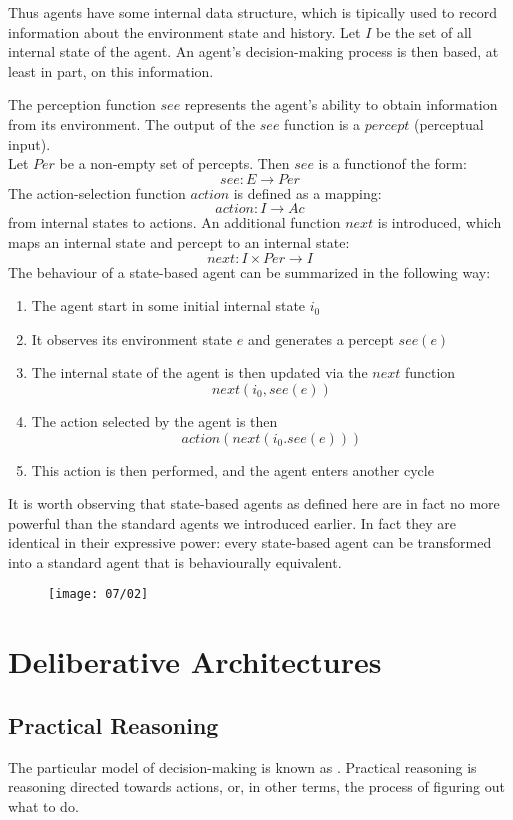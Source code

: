Thus agents have some internal data structure, which is tipically used to record information about the environment state and history. Let $I$ be the set of all internal state of the agent. An agent's decision-making process is then based, at least in part, on this information.

The perception function $see$ represents the agent's ability to obtain information from its environment. The output of the $see$ function is a $percept$ (perceptual input).\\
Let $Per$ be a non-empty set of percepts. Then $see$ is a functionof the form:
\[see: E\rightarrow Per\]
The action-selection function $action$ is defined as a mapping:
\[action : I \rightarrow Ac\]
from internal states to actions. An additional function $next$ is introduced, which maps an internal state and percept to an internal state:
\[next: I \times Per \rightarrow I\]
The behaviour of a state-based agent can be summarized in the following way:
\begin{enumerate}
\item The agent start in some initial internal state $i_0$
\item It observes its environment state $e$ and generates a percept $see(e)$
\item The internal state of the agent is then updated via the $next$ function
\[next(i_0, see(e))\]
\item The action selected by the agent is then 
\[action(next(i_0. see(e)))\]
\item This action is then performed, and the agent enters another cycle
\end{enumerate}

It is worth observing that state-based agents as defined here are in fact no more powerful than the standard agents we introduced earlier. In fact they are identical in their expressive power: every state-based agent can be transformed into a standard agent that is behaviourally equivalent.


\begin{figure}[!h]
\centering
\texttt{[image: 07/02]}
\end{figure}

\section{Deliberative Architectures}
\subsection{Practical Reasoning}
The particular model of decision-making is known as . Practical reasoning is reasoning directed towards actions, or, in other terms, the process of figuring out what to do.

